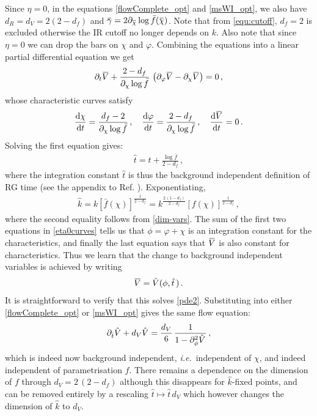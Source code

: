\documentclass[11pt]{book}
\newcommand{\overbar}[1]{\mkern 1.5mu\overline{\mkern-1.5mu#1\mkern-1.5mu}\mkern 1.5mu}
\newcommand{\bV}{\overbar V}
\newcommand{\bg}{\overbar \gamma}
\newcommand{\bc}{\overbar \chi}
\newcommand\ie{\textit{i.e.}\ }
\newcommand{\vp}{\varphi}
\newcommand{\hV}{\hat V}
\newcommand{\hk}{\hat k}
\newcommand{\hatt}{\hat t}
\numberwithin{equation}{chapter}
\begin{document}
Since $\eta=0$, in the equations \eqref{flowComplete_opt} and \eqref{msWI_opt},
we also have $d_R=d_V=2(2-d_f)$ and $\bg = 2\partial_{\bc}\log\bar{f}(\bc)$.
Note that from \eqref{equ:cutoff}, $d_f=2$ is excluded otherwise the IR cutoff no longer depends on $k$.
Also note that since $\eta=0$ we can drop the bars on $\chi$ and $\vp$.
Combining the equations into a linear partial differential equation we get
\begin{align}
  \label{pde2}
  \partial_t\bV +\frac{2-d_f}{\partial_{\chi}\log\bar{f}} \,
  \left(\partial_{\vp}\bV-\partial_{\chi}\bV\right) =0\,,
\end{align}
whose characteristic curves satisfy
\begin{align}
  \label{eta0curves}
  \frac{\mathrm d\chi}{\mathrm dt}=\frac{d_f-2}{\partial_{\chi}\log\bar{f}}\,,
  \quad
  \frac{\mathrm d\vp}{\mathrm dt}=\frac{2-d_f}{\partial_{\chi}\log\bar{f}}\,,
  \quad
  \frac{\mathrm d\bV}{\mathrm dt}=0\,.
\end{align}
Solving the first equation gives:
\begin{align}
  \label{hatt}
  \hatt = t+\frac{\log\bar{f}}{2-d_f}\,,
\end{align}
where the integration constant $\hatt$ is thus the background independent definition of RG time
(see the appendix to Ref. \cite{Dietz:2015owa}). Exponentiating,
\begin{align}
  \hk = k \left[ \bar{f}(\chi) \right]^{\frac{1}{2-d_f}} = k^{\frac{2\,(1-d_f)}{2-d_f}}
  \left[ f(\chi) \right]^{\frac{1}{2-d_f}}\,,
\end{align}
where the second equality follows from \eqref{dim-vars}.
The sum of the first two equations in \eqref{eta0curves} tells us that $\phi=\vp+\chi$ is an
integration constant for the characteristics,
and finally the last equation says that $\bV$ is also constant for characteristics.
Thus we learn that the change to background independent variables is achieved by writing
\begin{align}
  \label{background-independent}
  \bV = \hV(\phi,\hatt\,)\,.
\end{align}
It is straightforward to verify that this solves \eqref{pde2}.
Substituting into either \eqref{flowComplete_opt} or \eqref{msWI_opt} gives the same flow equation:
\begin{align}
  \label{bi-flow}
  \partial_{\hatt}\hV +d_V\hV = \frac{d_V}{6} \, \frac{1}{1-\partial^2_\phi\hV^{\vphantom{H^H}}}\,,
\end{align}
which is indeed now background independent, \ie independent of $\chi$,
and indeed independent of parametrisation $f$.
There remains a dependence on the dimension of $f$ through $d_V = 2\,(2-d_f)$ although this disappears
for $\hk$-fixed points, and can be removed entirely by a rescaling $\hatt\mapsto \hatt\, d_V$ which however
changes the dimension of $\hat{k}$ to $d_V$.
\end{document}
